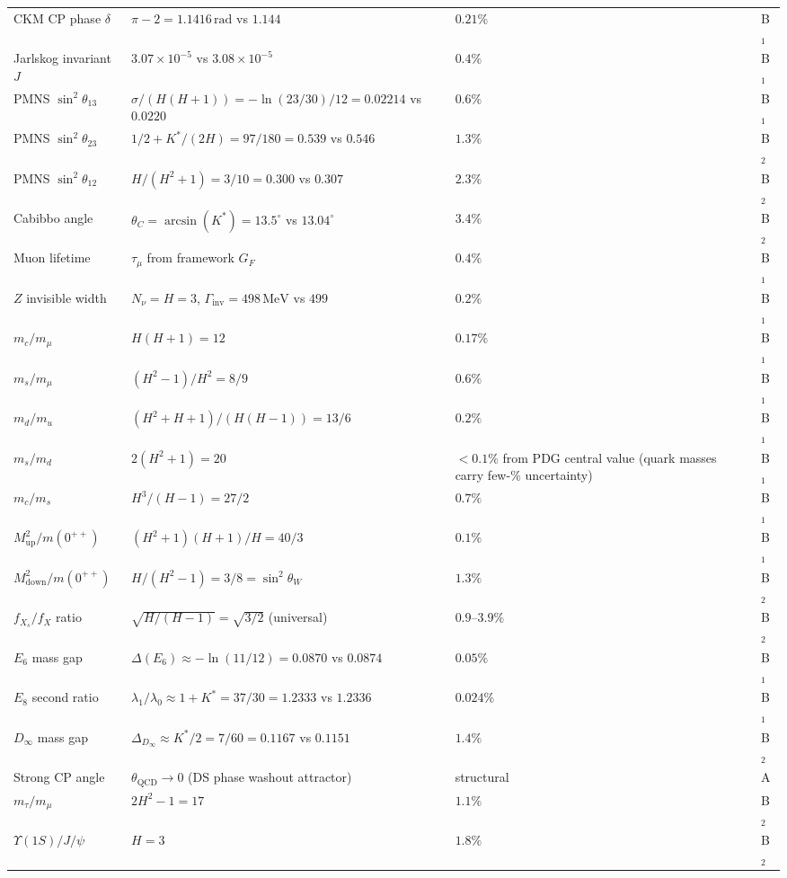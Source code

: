 \documentclass[11pt,a4paper]{article}
\theoremstyle{definition}
\theoremstyle{remark}
\begin{document}
\begin{longtable}{p{3.8cm}p{7.2cm}p{3.0cm}l}
CKM CP phase $\delta$ & $\pi-2=1.1416\,\mathrm{rad}$ vs $1.144$ & $0.21\%$ & B$_1$ \\
Jarlskog invariant $J$ & $3.07\times 10^{-5}$ vs $3.08\times 10^{-5}$ & $0.4\%$ & B$_1$ \\
PMNS $\sin^2\theta_{13}$ & $\sigma/(H(H+1))=-\ln(23/30)/12=0.02214$ vs $0.0220$ & $0.6\%$ & B$_1$ \\
PMNS $\sin^2\theta_{23}$ & $1/2+K^*/(2H)=97/180=0.539$ vs $0.546$ & $1.3\%$ & B$_2$ \\
PMNS $\sin^2\theta_{12}$ & $H/(H^2+1)=3/10=0.300$ vs $0.307$ & $2.3\%$ & B$_2$ \\
Cabibbo angle & $\theta_C=\arcsin(K^*)=13.5^\circ$ vs $13.04^\circ$ & $3.4\%$ & B$_2$ \\
Muon lifetime & $\tau_\mu$ from framework $G_F$ & $0.4\%$ & B$_1$ \\
$Z$ invisible width & $N_\nu=H=3$, $\Gamma_{\mathrm{inv}}=498\,\mathrm{MeV}$ vs $499$ & $0.2\%$ & B$_1$ \\
$m_c/m_\mu$ & $H(H+1)=12$ & $0.17\%$ & B$_1$ \\
$m_s/m_\mu$ & $(H^2-1)/H^2=8/9$ & $0.6\%$ & B$_1$ \\
$m_d/m_u$ & $(H^2+H+1)/(H(H-1))=13/6$ & $0.2\%$ & B$_1$ \\
$m_s/m_d$ & $2(H^2+1)=20$ & $<0.1\%$ from PDG central value (quark masses carry few-\% uncertainty) & B$_1$ \\
$m_c/m_s$ & $H^3/(H-1)=27/2$ & $0.7\%$ & B$_1$ \\
$M^2_{\mathrm{up}}/m(0^{++})$ & $(H^2+1)(H+1)/H=40/3$ & $0.1\%$ & B$_1$ \\
$M^2_{\mathrm{down}}/m(0^{++})$ & $H/(H^2-1)=3/8=\sin^2\theta_W$ & $1.3\%$ & B$_2$ \\
$f_{X_s}/f_X$ ratio & $\sqrt{H/(H-1)}=\sqrt{3/2}$ (universal) & $0.9$--$3.9\%$ & B$_2$ \\
$E_6$ mass gap & $\Delta(E_6)\approx -\ln(11/12)=0.0870$ vs $0.0874$ & $0.05\%$ & B$_1$ \\
$E_8$ second ratio & $\lambda_1/\lambda_0\approx 1+K^*=37/30=1.2333$ vs $1.2336$ & $0.024\%$ & B$_1$ \\
$D_\infty$ mass gap & $\Delta_{D_\infty}\approx K^*/2=7/60=0.1167$ vs $0.1151$ & $1.4\%$ & B$_2$ \\
Strong CP angle & $\theta_\mathrm{QCD}\to 0$ (DS phase washout attractor) & structural & A \\
\midrule
$m_\tau/m_\mu$ & $2H^2-1=17$ & $1.1\%$ & B$_2$ \\
$\Upsilon(1S)/J/\psi$ & $H=3$ & $1.8\%$ & B$_2$ \\

\end{longtable}
\end{document}

